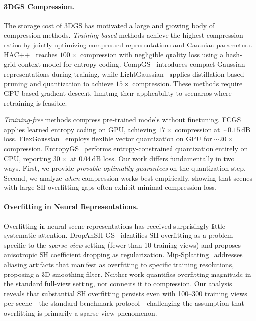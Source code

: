 \documentclass[sigconf,review]{acmart}
\newcommand{\dB}{\,\text{dB}}
\begin{document}
\paragraph{3DGS Compression.}
The storage cost of 3DGS has motivated a large and growing body of compression methods.
\emph{Training-based} methods achieve the highest compression ratios by jointly optimizing compressed representations and Gaussian parameters.
HAC++~\cite{chen2025hacpp} reaches $100{\times}$ compression with negligible quality loss using a hash-grid context model for entropy coding.
CompGS~\cite{compact3d2024} introduces compact Gaussian representations during training, while LightGaussian~\cite{lightgaussian2024} applies distillation-based pruning and quantization to achieve $15{\times}$ compression.
These methods require GPU-based gradient descent, limiting their applicability to scenarios where retraining is feasible.

\emph{Training-free} methods compress pre-trained models without finetuning.
FCGS~\cite{chen2024fcgs} applies learned entropy coding on GPU, achieving $17{\times}$ compression at ${\sim}0.15\dB$ loss.
FlexGaussian~\cite{flexgaussian2025} employs flexible vector quantization on GPU for ${\sim}20{\times}$ compression.
EntropyGS~\cite{entropygs2025} performs entropy-constrained quantization entirely on CPU, reporting $30{\times}$ at $0.04\dB$ loss.
Our work differs fundamentally in two ways.
First, we provide \emph{provable optimality guarantees} on the quantization step.
Second, we analyze \emph{when} compression works best empirically, showing that scenes with large SH overfitting gaps often exhibit minimal compression loss.

\paragraph{Overfitting in Neural Representations.}
Overfitting in neural scene representations has received surprisingly little systematic attention.
DropAnSH-GS~\cite{dropanshgs2026} identifies SH overfitting as a problem specific to the \emph{sparse-view} setting (fewer than 10 training views) and proposes anisotropic SH coefficient dropping as regularization.
Mip-Splatting~\cite{mipsplatting2024} addresses aliasing artifacts that manifest as overfitting to specific training resolutions, proposing a 3D smoothing filter.
Neither work quantifies overfitting magnitude in the standard full-view setting, nor connects it to compression.
Our analysis reveals that substantial SH overfitting persists even with 100--300 training views per scene---the standard benchmark protocol---challenging the assumption that overfitting is primarily a sparse-view phenomenon.
\end{document}

